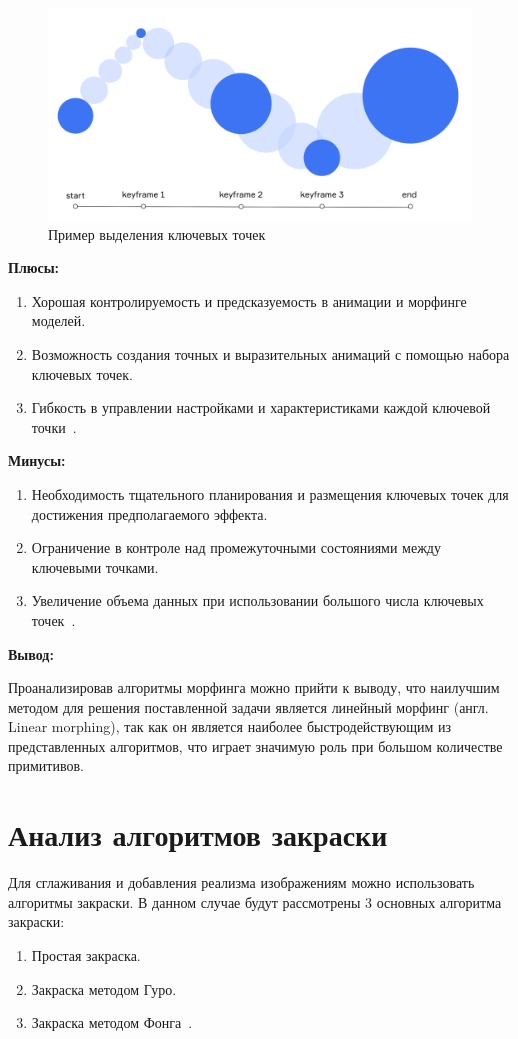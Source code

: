 \begin{figure}[H]
	\centering
	\includegraphics[scale=0.4]{images/key_frames.png}
	\caption{Пример выделения ключевых точек}
	\label{fig:key_frames}
\end{figure}


\textbf{Плюсы:}
\begin{enumerate}
	\item Хорошая контролируемость и предсказуемость в анимации и морфинге моделей.
	\item Возможность создания точных и выразительных анимаций с помощью набора ключевых точек.
	\item Гибкость в управлении настройками и характеристиками каждой ключевой точки~\cite{morphing_methods}.
\end{enumerate}

\textbf{Минусы:}
\begin{enumerate}
	\item Необходимость тщательного планирования и размещения ключевых точек для достижения предполагаемого эффекта.
	\item Ограничение в контроле над промежуточными состояниями между ключевыми точками.
	\item Увеличение объема данных при использовании большого числа ключевых точек~\cite{morphing_methods}.
\end{enumerate}

\textbf{Вывод:}

Проанализировав алгоритмы морфинга можно прийти к выводу, что наилучшим методом для решения поставленной задачи является линейный морфинг (англ. Linear morphing), так как он является наиболее быстродействующим из представленных алгоритмов, что играет значимую роль при большом количестве примитивов.


\section{Анализ алгоритмов закраски}
\label{sec:draw_algo_analysis}
Для сглаживания и добавления реализма изображениям можно использовать алгоритмы закраски.
В данном случае будут рассмотрены 3 основных алгоритма закраски:
\begin{enumerate}
	\item Простая закраска.
	\item Закраска методом Гуро.
	\item Закраска методом Фонга~\cite{draw_methods}.
\end{enumerate}


